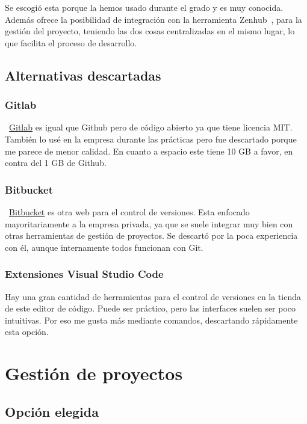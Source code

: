Se escogió esta porque la hemos usado durante el grado y es muy conocida. Además ofrece la posibilidad de integración con la herramienta Zenhub~\pageref{zenhub}, para la gestión del proyecto, teniendo las dos cosas centralizadas en el mismo lugar, lo que facilita el proceso de desarrollo.

\subsection{Alternativas descartadas}

\subsubsection{Gitlab}
~\href{https://gitlab.com/}{Gitlab} es igual que Github pero de código abierto ya que tiene licencia MIT. También lo usé en la empresa durante las prácticas pero fue descartado porque me parece de menor calidad. En cuanto a espacio este tiene 10 GB a favor, en contra del 1 GB de Github.

\subsubsection{Bitbucket}
~\href{https://bitbucket.org/product//}{Bitbucket} es otra web para el control de versiones. Esta enfocado mayoritariamente a la empresa privada, ya que se suele integrar muy bien con otras herramientas de gestión de proyectos. Se descartó por la poca experiencia con él, aunque internamente todos funcionan con Git.

\subsubsection{Extensiones Visual Studio Code}
Hay una gran cantidad de herramientas para el control de versiones en la tienda de este editor de código. Puede ser práctico, pero las interfaces suelen ser poco intuitivas. Por eso me gusta más mediante comandos, descartando rápidamente esta opción.

\section{Gestión de proyectos}

\subsection{Opción elegida}

